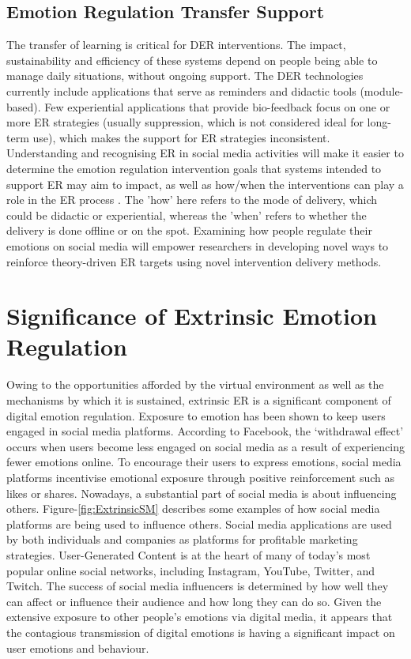 \documentclass[lettersize,journal]{IEEEtran}
\begin{document}
\subsection{Emotion Regulation Transfer Support}
The transfer of learning is critical for DER interventions. The impact, sustainability and efficiency of these systems depend on people being able to manage daily situations, without ongoing support. The DER technologies currently include applications that serve as reminders and didactic tools (module-based). Few experiential applications that provide bio-feedback focus on one or more ER strategies (usually suppression, which is not considered ideal for long-term use), which makes the support for ER strategies inconsistent. Understanding and recognising ER in social media activities will make it easier to determine the emotion regulation intervention goals that systems intended to support ER may aim to impact, as well as how/when the interventions can play a role in the ER process \cite{slovak2022designing}. The 'how' here refers to the mode of delivery, which could be didactic or experiential, whereas the 'when' refers to whether the delivery is done offline or on the spot. Examining how people regulate their emotions on social media will empower researchers in developing novel ways to reinforce theory-driven ER targets using novel intervention delivery methods.




\section{Significance of Extrinsic Emotion Regulation}
Owing to the opportunities afforded by the virtual environment as well as the mechanisms by which it is sustained, extrinsic ER is a significant component of digital emotion regulation. Exposure to emotion has been shown to keep users engaged in social media platforms. According to Facebook, the `withdrawal effect' occurs when users become less engaged on social media as a result of experiencing fewer emotions online. To encourage their users to express emotions, social media platforms incentivise emotional exposure through positive reinforcement such as likes or shares. Nowadays, a substantial part of social media is about influencing others. Figure-\ref{fig:ExtrinsicSM} describes some examples of how social media platforms are being used to influence others. Social media applications are used by both individuals and companies as platforms for profitable marketing strategies. User-Generated Content is at the heart of many of today's most popular online social networks, including Instagram, YouTube, Twitter, and Twitch. The success of social media influencers is determined by how well they can affect or influence their audience and how long they can do so. Given the extensive exposure to other people's emotions via digital media, it appears that the contagious transmission of digital emotions is having a significant impact on user emotions and behaviour.
\end{document}
